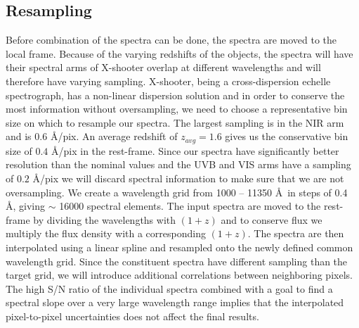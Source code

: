 \documentclass{aa}    %
\newcommand{\sectlabel}[1]{\label{sect:#1}}
\begin{document}
\subsection{Resampling} \sectlabel{rebin}

Before combination of the spectra can be done, the spectra are moved
to the local frame. Because of the varying redshifts of the objects,
the spectra will have their spectral arms of X-shooter overlap at
different wavelengths and will therefore have varying
sampling. X-shooter, being a cross-dispersion echelle spectrograph,
has a non-linear dispersion solution and in order to conserve the most
information without oversampling, we need to choose a representative
bin size on which to resample our spectra. The largest sampling is in
the NIR arm and is $0.6$ \AA/pix. An average redshift of $z_{avg}
= 1.6$ gives us the conservative bin size of $0.4$ \AA/pix in the
rest-frame.  
Since our spectra have significantly better resolution than the
nominal values and the UVB and VIS arms have a sampling of $0.2$
\AA/pix we will discard spectral information to make sure that we are
not oversampling. We create a wavelength grid from 1000 -- 11350 \AA~in
steps of 0.4 \AA, giving $\sim$ 16000 spectral elements. The input spectra are moved to the rest-frame
by dividing the wavelengths with $(1 + z)$ and to conserve flux we
multiply the flux density with a corresponding $(1 + z)$. The spectra
are then interpolated using a linear spline and
resampled onto the newly defined common wavelength grid. Since the
constituent spectra have different sampling than the target grid, we
will introduce additional correlations between neighboring
pixels. The high S/N ratio of the individual spectra combined with a goal to
find a spectral slope over a very large wavelength range implies that the
interpolated pixel-to-pixel uncertainties does not affect the final results.



\end{document}
